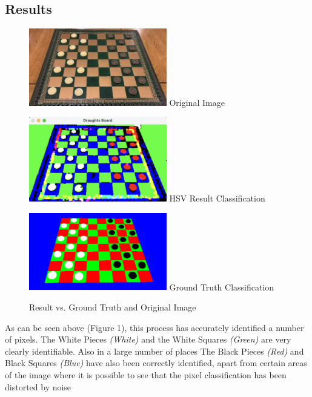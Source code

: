 \documentclass[12pt]{article}
\begin{document}
    \subsection{Results}
    \begin{figure}
        \begin{minipage}[c]{0.4\linewidth}
            \centering
            \includegraphics[width=6cm]{DraughtsGame1Move0.png}
            Original Image
        \end{minipage}\hfill
        \begin{minipage}[c]{0.4\linewidth}
            \centering
            \includegraphics[width=6cm]{HSV-Combined-Image.png}
            HSV Result Classification
        \end{minipage}\hfill
        \begin{minipage}[c]{0.4\linewidth}
            \centering
            \includegraphics[width=6cm]{DraughtsGame1Move0GroundTruth.png}
            Ground Truth Classification
        \end{minipage}
        \caption{Result vs. Ground Truth and Original Image}
    \end{figure}
    \par
    As can be seen above (Figure 1), this process has accurately identified a number of pixels. The White Pieces \emph{(White)} and the White Squares \emph{(Green)} are very clearly identifiable. Also in a large number of places
    The Black Pieces \emph{(Red)} and Black Squares \emph{(Blue)} have also been correctly identified, apart from certain areas of the image where it is possible to see that the pixel classification has been distorted by noise 
\end{document}
